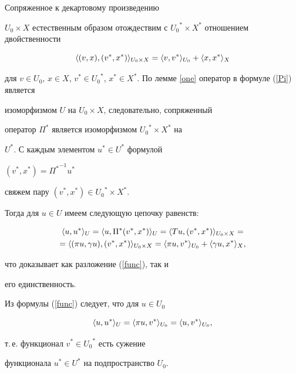 \begin{pf}


Сопряженное к декартовому произведению


$U_0 \times X$ естественным образом отождествим с ${U_0}^*


\times X^*$ отношением двойственности


$$


\la (v,x), (v^*, x^*)\ra _{U_0 \times X}=\la v, v^*\ra _{U_0}+\la x,


x^*\ra _X


$$


для $v \in U_0$, $x \in X$, $v^* \in {U_0}^*$, $x^*


\in X^*$. По лемме \ref{one} оператор в формуле (\ref{Pi}) является


изоморфизмом $U$ на $U_0 \times X$, следовательно, сопряженный


оператор $\Pi^*$ является изоморфизмом ${U_0}^* \times X^*$ на


$U^*$. С каждым элементом $u^* \in U^*$ формулой


$(v^*, x^*)={\Pi^*}^{-1}u^*$


свяжем пару $(v^*, x^*) \in {U_0}^* \times X^*$.


Тогда для $u \in U$ имеем следующую цепочку равенств:


\begin{multline*}


\la u, u^*\ra _U=\la u, \Pi^*(v^*, x^*)\ra _U=\la Tu, (v^*,


x^*)\ra _{U_0 \times X} = \\


%


= \la (\pi u, \gamma u), (v^*, x^*)\ra _{U_0 \times X}


= \la \pi u, v^*\ra _{U_0}+\la \gamma u, x^*\ra _X,


\end{multline*}


что доказывает как разложение (\ref{func}), так и


его единственность.


\end{pf}





\begin{notenonum}


Из формулы (\ref{func}) следует, что для $u \in U_0$


$$


\la u, u^*\ra _U=\la \pi u, v^*\ra _{U_0}=\la u, v^*\ra _{U_0},


$$


т.\,е. функционал $v^* \in {U_0}^*$ есть сужение


функционала $u^* \in U^*$ на подпространство $U_0$.


\end{notenonum}






